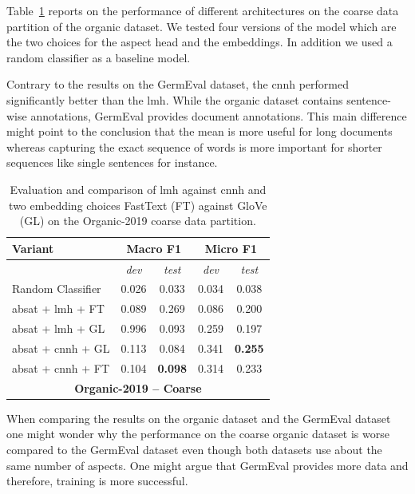 \bigskip
Table~\ref{tab:06_resultsOrganic2} reports on the performance of different architectures on the coarse data partition of the organic dataset. We tested four versions of the model which are the two choices for the aspect head and the embeddings. In addition we used a random classifier as a baseline model.
\medskip

Contrary to the results on the GermEval dataset, the \acrfull{cnnh} performed significantly better than the \acrfull{lmh}. While the organic dataset contains sentence-wise annotations, GermEval provides document annotations. This main difference might point to the conclusion that the mean is more useful for long documents whereas capturing the exact sequence of words is more important for shorter sequences like single sentences for instance. 
\bigskip

\begin{table}[htb]
	\centering
	\begin{tabular*}{\textwidth}{l@{\extracolsep{\fill}}cccc@{}}
	\toprule
	Variant          & \multicolumn{2}{c}{\textbf{Macro F1}}     & \multicolumn{2}{c}{\textbf{Micro F1}}       \\ 
	\midrule
					 & \textit{dev}      	& \textit{test} 		& \textit{dev}      		& \textit{test} 		\\
	\midrule

	Random Classifier          		&  0.026 		& 0.033&  0.034 &   0.038  				\\
	\gls{absat} + \gls{lmh} + FT    & 0.089     & 0.269	&  0.086 &   0.200   			\\ 
	\gls{absat} + \gls{lmh} + GL    & 0.996     & 0.093	&  0.259 &   0.197   			\\ 

	\gls{absat} + \gls{cnnh} + GL   & 0.113     & 0.084	& 0.341   &  \textbf{0.255} 				\\ 	
	\gls{absat} + \gls{cnnh} + FT   & 0.104     & \textbf{0.098} & 0.314  &   0.233				\\ 
	\bottomrule
	\multicolumn{5}{c}{\textbf{Organic-2019 -- Coarse}} \\
	\end{tabular*}
	\caption{Evaluation and comparison of \acrfull{lmh} against \acrfull{cnnh} and two embedding choices FastText {(FT)} against GloVe {(GL)} on the Organic-2019 coarse data partition.}
	\label{tab:06_resultsOrganic2}
\end{table}

When comparing the results on the organic dataset and the GermEval dataset one might wonder why the performance on the coarse organic dataset is worse compared to the GermEval dataset even though both datasets use about the same number of aspects. One might argue that GermEval provides more data and therefore, training is more successful.

